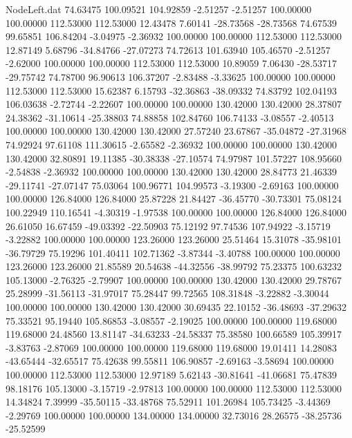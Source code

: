 \begin{filecontents}{NodeLeft.dat}
  74.63475  100.09521  104.92859    -2.51257   -2.51257  100.00000  100.00000  112.53000  112.53000   12.43478    7.60141  -28.73568  -28.73568
  74.67539   99.65851  106.84204    -3.04975   -2.36932  100.00000  100.00000  112.53000  112.53000   12.87149    5.68796  -34.84766  -27.07273
  74.72613  101.63940  105.46570    -2.51257   -2.62000  100.00000  100.00000  112.53000  112.53000   10.89059    7.06430  -28.53717  -29.75742
  74.78700   96.90613  106.37207    -2.83488   -3.33625  100.00000  100.00000  112.53000  112.53000   15.62387    6.15793  -32.36863  -38.09332
  74.83792  102.04193  106.03638    -2.72744   -2.22607  100.00000  100.00000  130.42000  130.42000   28.37807   24.38362  -31.10614  -25.38803
  74.88858  102.84760  106.74133    -3.08557   -2.40513  100.00000  100.00000  130.42000  130.42000   27.57240   23.67867  -35.04872  -27.31968
  74.92924   97.61108  111.30615    -2.65582   -2.36932  100.00000  100.00000  130.42000  130.42000   32.80891   19.11385  -30.38338  -27.10574
  74.97987  101.57227  108.95660    -2.54838   -2.36932  100.00000  100.00000  130.42000  130.42000   28.84773   21.46339  -29.11741  -27.07147
  75.03064  100.96771  104.99573    -3.19300   -2.69163  100.00000  100.00000  126.84000  126.84000   25.87228   21.84427  -36.45770  -30.73301
  75.08124  100.22949  110.16541    -4.30319   -1.97538  100.00000  100.00000  126.84000  126.84000   26.61050   16.67459  -49.03392  -22.50903
  75.12192   97.74536  107.94922    -3.15719   -3.22882  100.00000  100.00000  123.26000  123.26000   25.51464   15.31078  -35.98101  -36.79729
  75.19296  101.40411  102.71362    -3.87344   -3.40788  100.00000  100.00000  123.26000  123.26000   21.85589   20.54638  -44.32556  -38.99792
  75.23375  100.63232  105.13000    -2.76325   -2.79907  100.00000  100.00000  130.42000  130.42000   29.78767   25.28999  -31.56113  -31.97017
  75.28447   99.72565  108.31848    -3.22882   -3.30044  100.00000  100.00000  130.42000  130.42000   30.69435   22.10152  -36.48693  -37.29632
  75.33521   95.19440  105.86853    -3.08557   -2.19025  100.00000  100.00000  119.68000  119.68000   24.48560   13.81147  -34.63233  -24.58337
  75.38580  100.66589  105.39917    -3.83763   -2.87069  100.00000  100.00000  119.68000  119.68000   19.01411   14.28083  -43.65444  -32.65517
  75.42638   99.55811  106.90857    -2.69163   -3.58694  100.00000  100.00000  112.53000  112.53000   12.97189    5.62143  -30.81641  -41.06681
  75.47839   98.18176  105.13000    -3.15719   -2.97813  100.00000  100.00000  112.53000  112.53000   14.34824    7.39999  -35.50115  -33.48768
  75.52911  101.26984  105.73425    -3.44369   -2.29769  100.00000  100.00000  134.00000  134.00000   32.73016   28.26575  -38.25736  -25.52599

\end{filecontents}

